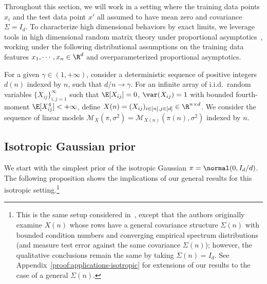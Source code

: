 \documentclass[11pt]{article}
\newcommand{\model}{\mathscr{M}}
\begin{document}
Throughout this section, we will work in a setting where the training data points $x_i$ and the test data point $x'$ all assumed to have mean zero and covariance $\Sigma = I_d$.
To characterize high dimensional behaviors by exact limits, we leverage tools in high dimensional random matrix theory under proportional asymptotics~\citep{bai2010spectral}, working under the following distributional assumptions on the training data features $x_1, \cdots, x_n \in \R^d$ and overparameterized proportional asymptotics. 
\begin{assumption} \label{assmp:proportional-asymptotics} For a given $\gamma \in (1, +\infty)$, consider a deterministic sequence of positive integers $d(n)$ indexed by $n$, such that $d/n \to \gamma$. For an infinite array of i.i.d.\ random variables $\{X_{ij}\}_{i,j=1}^\infty$ such that $\E[X_{ij}]=0$, $\var(X_{ij})=1$ with bounded fourth-moment $\E[X_{ij}^4] < +\infty$, define $X(n)=(X_{ij})_{i \in [n], j \in [d]} \in \R^{n \times d}$. We consider the sequence of linear models $\model_X(\pi, \sigma^2)=\model_{X(n)}(\pi(n), \sigma^2)$ indexed by $n$. 
\end{assumption}
\subsection{Isotropic Gaussian prior} \label{sec:example_1}
We start with the simplest prior of the isotropic Gaussian $\pi = \normal(0, I_d/d)$. The following proposition shows the implications of our general results for this isotropic setting.\footnote{This is the same setup considered in~\cite{cheng2022memorize}, except that the authors originally examine $X(n)$ whose rows have a general covariance structure $\Sigma(n)$ with bounded condition numbers and converging empirical spectrum distributions (and measure test error against the same covariance $\Sigma(n)$); however, the qualitative conclusions remain the same by taking $\Sigma(n) = I_d$. See Appendix~\ref{proof:applications-isotropic} for extensions of our results to the case of a general $\Sigma(n)$.}
\end{document}
